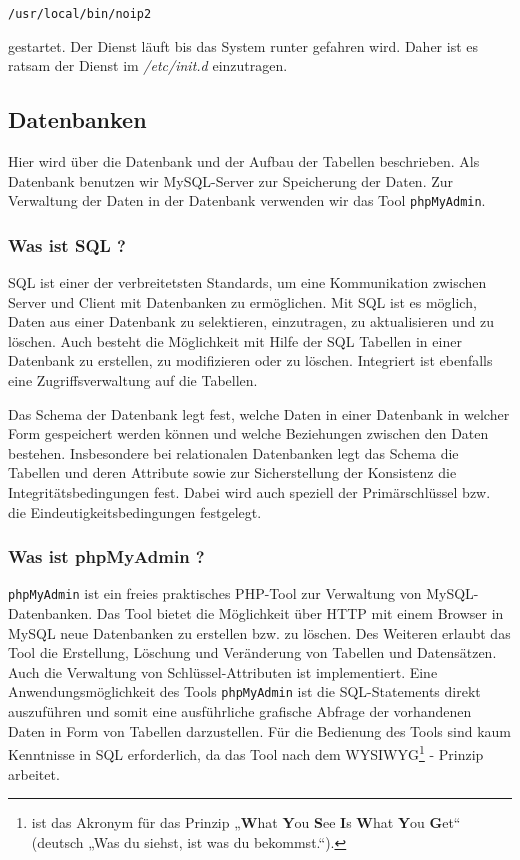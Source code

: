 \begin{lstlisting}
/usr/local/bin/noip2
\end{lstlisting}

gestartet. Der Dienst läuft bis das System runter gefahren wird. Daher ist es ratsam der Dienst im \textit{/etc/init.d} einzutragen.

\subsection{Datenbanken}
Hier wird über die Datenbank und der Aufbau der Tabellen beschrieben. Als Datenbank benutzen wir MySQL-Server zur Speicherung der Daten. Zur Verwaltung der Daten in der Datenbank verwenden wir das Tool \texttt{phpMyAdmin}.

\subsubsection{Was ist SQL ?}
SQL ist einer der verbreitetsten Standards, um eine Kommunikation zwischen Server und Client mit Datenbanken zu ermöglichen. Mit SQL ist es möglich, Daten aus einer Datenbank zu selektieren, einzutragen, zu aktualisieren und zu löschen. Auch besteht die Möglichkeit mit Hilfe der SQL Tabellen in einer Datenbank zu erstellen, zu modifizieren oder zu löschen. Integriert ist ebenfalls eine Zugriffsverwaltung auf die Tabellen. 

Das Schema der Datenbank legt fest, welche Daten in einer Datenbank in welcher Form gespeichert werden können und welche Beziehungen zwischen den Daten bestehen. Insbesondere bei relationalen Datenbanken legt das Schema die Tabellen und deren Attribute sowie zur Sicherstellung der Konsistenz die Integritätsbedingungen fest. Dabei wird auch speziell der Primärschlüssel bzw. die Eindeutigkeitsbedingungen festgelegt.

\subsubsection{Was ist phpMyAdmin ?}
\texttt{phpMyAdmin} ist ein freies praktisches PHP-Tool zur Verwaltung von MySQL-Datenbanken. Das Tool bietet die Möglichkeit über HTTP mit einem Browser in MySQL neue Datenbanken zu erstellen bzw. zu löschen. Des Weiteren erlaubt das Tool die Erstellung, Löschung und Veränderung von Tabellen und Datensätzen. Auch die Verwaltung von Schlüssel-Attributen ist implementiert. Eine Anwendungsmöglichkeit des Tools \texttt{phpMyAdmin} ist die SQL-Statements direkt auszuführen und somit eine ausführliche grafische Abfrage der vorhandenen Daten in Form von Tabellen darzustellen. Für die Bedienung des Tools sind kaum Kenntnisse in SQL erforderlich, da das Tool nach dem WYSIWYG\footnote{ist das Akronym für das Prinzip „\textbf{W}hat \textbf{Y}ou \textbf{S}ee \textbf{I}s \textbf{W}hat \textbf{Y}ou \textbf{G}et“ (deutsch „Was du siehst, ist was du bekommst.“).} - Prinzip arbeitet.


